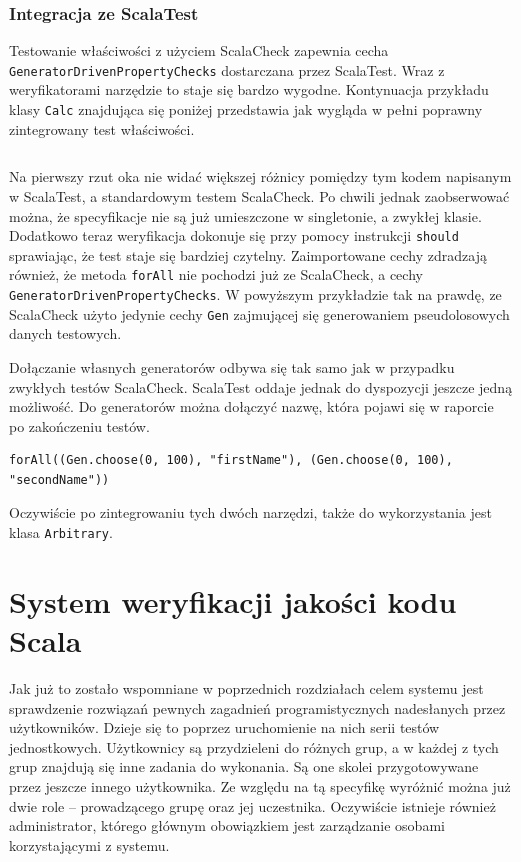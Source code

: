 \documentclass[brudnopis]{xmgr}
\begin{document}
\subsection{Integracja ze ScalaTest}

Testowanie właściwości z użyciem ScalaCheck zapewnia cecha \texttt{GeneratorDrivenPropertyChecks} dostarczana przez ScalaTest. Wraz z weryfikatorami narzędzie to staje się bardzo wygodne. Kontynuacja przykładu klasy \texttt{Calc} znajdująca się poniżej przedstawia jak wygląda w pełni poprawny zintegrowany test właściwości. 

\inputminted[fontsize=\small]{scala}{code/CalcTestScalaTest.scala}

Na pierwszy rzut oka nie widać większej różnicy pomiędzy tym kodem napisanym w ScalaTest, a standardowym testem ScalaCheck. Po chwili jednak zaobserwować można, że specyfikacje nie są już umieszczone w singletonie, a zwykłej klasie. Dodatkowo teraz weryfikacja dokonuje się przy pomocy instrukcji \texttt{should} sprawiając, że test staje się bardziej czytelny. Zaimportowane cechy zdradzają również, że metoda \texttt{forAll} nie pochodzi już ze ScalaCheck, a cechy \texttt{GeneratorDrivenPropertyChecks}. W powyższym przykładzie tak na prawdę, ze ScalaCheck użyto jedynie cechy \texttt{Gen} zajmującej się generowaniem pseudolosowych danych testowych.

Dołączanie własnych generatorów odbywa się tak samo jak w przypadku zwykłych testów ScalaCheck. ScalaTest oddaje jednak do dyspozycji jeszcze jedną możliwość. Do generatorów można dołączyć nazwę, która pojawi się w raporcie po zakończeniu testów.

\begin{verbatim}
forAll((Gen.choose(0, 100), "firstName"), (Gen.choose(0, 100), "secondName"))
\end{verbatim}

Oczywiście po zintegrowaniu tych dwóch narzędzi, także do wykorzystania jest klasa \texttt{Arbitrary}.

\chapter{System weryfikacji jakości kodu Scala}

Jak już to zostało wspomniane w poprzednich rozdziałach celem systemu jest sprawdzenie rozwiązań pewnych zagadnień programistycznych nadesłanych przez użytkowników. Dzieje się to poprzez uruchomienie na nich serii testów jednostkowych. Użytkownicy są przydzieleni do różnych grup, a w każdej z tych grup znajdują się inne zadania do wykonania. Są one skolei przygotowywane przez jeszcze innego użytkownika. Ze względu na tą specyfikę wyróżnić można już dwie role -- prowadzącego grupę oraz jej uczestnika. Oczywiście istnieje również administrator, którego głównym obowiązkiem jest zarządzanie osobami korzystającymi z systemu.
\end{document}
